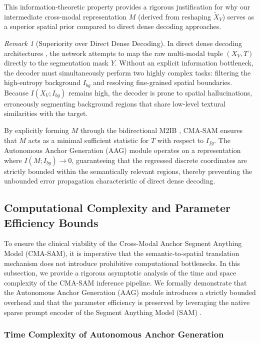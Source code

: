 \documentclass[onecolumn]{IEEEtran}
\numberwithin{equation}{section}
\theoremstyle{definition}
\theoremstyle{remark}
\newtheorem{remark}[theorem]{Remark}
\begin{document}
This information-theoretic property provides a rigorous justification for why our intermediate cross-modal representation $M$ (derived from reshaping $\tilde{X}_V$) serves as a superior spatial prior compared to direct dense decoding approaches.

\begin{remark}[Superiority over Direct Dense Decoding]
In direct dense decoding architectures \cite{qian2024simplevilmedsam, koleilat2025medclip}, the network attempts to map the raw multi-modal tuple $(X_V, T)$ directly to the segmentation mask $Y$. Without an explicit information bottleneck, the decoder must simultaneously perform two highly complex tasks: filtering the high-entropy background $I_{bg}$ and resolving fine-grained spatial boundaries. Because $I(X_V; I_{bg})$ remains high, the decoder is prone to spatial hallucinations, erroneously segmenting background regions that share low-level textural similarities with the target. 

By explicitly forming $M$ through the bidirectional M2IB \cite{wang2023visual}, CMA-SAM ensures that $M$ acts as a minimal sufficient statistic for $T$ with respect to $I_{fg}$. The Autonomous Anchor Generation (AAG) module operates on a representation where $I(M; I_{bg}) \to 0$, guaranteeing that the regressed discrete coordinates are strictly bounded within the semantically relevant regions, thereby preventing the unbounded error propagation characteristic of direct dense decoding.
\end{remark}

\subsection{Computational Complexity and Parameter Efficiency Bounds}

To ensure the clinical viability of the Cross-Modal Anchor Segment Anything Model (CMA-SAM), it is imperative that the semantic-to-spatial translation mechanism does not introduce prohibitive computational bottlenecks. In this subsection, we provide a rigorous asymptotic analysis of the time and space complexity of the CMA-SAM inference pipeline. We formally demonstrate that the Autonomous Anchor Generation (AAG) module introduces a strictly bounded overhead and that the parameter efficiency is preserved by leveraging the native sparse prompt encoder of the Segment Anything Model (SAM) \cite{kirillov2023segment}.

\subsubsection{Time Complexity of Autonomous Anchor Generation}
\end{document}
